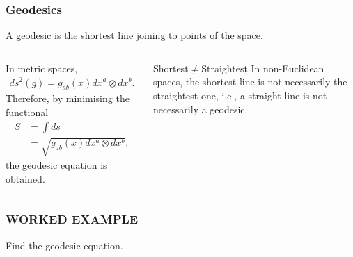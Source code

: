 \begin{frame}
  \frametitle{Geodesics}

  \begin{definition}
    A \alert{geodesic} is the shortest line joining to points of the space.
  \end{definition}

  \begin{columns}
    In metric spaces,
    \begin{align*}
      ds^2(g) = g_{ab}(x) dx^a\otimes dx^b.
    \end{align*}
    Therefore, by minimising the functional 
    \begin{align*}
      S&=\int ds\\
      &= \sqrt{g_{ab}(x) dx^a\otimes dx^b},
    \end{align*}
    the geodesic equation is obtained.
    \begin{alertblock}{Shortest$\neq$Straightest}
      In non-Euclidean spaces, the shortest line is not necessarily the straightest one, i.e., a straight line is not necessarily a geodesic.
    \end{alertblock}
  \end{columns}
\end{frame}

{
  \begin{frame}
    \frametitle{\alert{WORKED EXAMPLE}}
    Find the geodesic equation.
  \end{frame}
}

